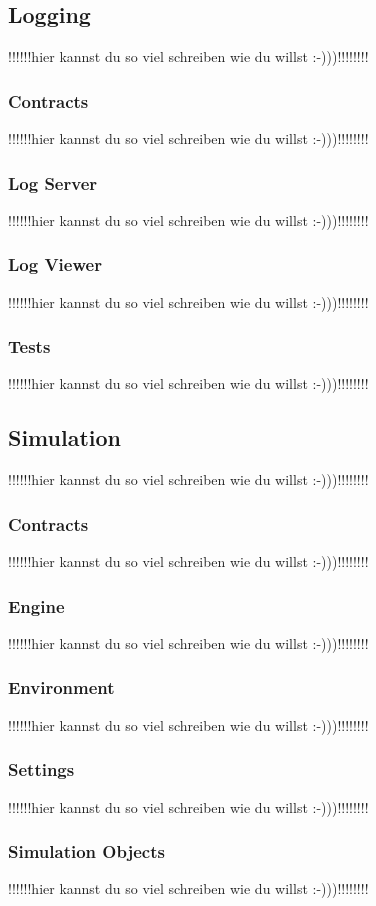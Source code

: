 \documentclass[12pt,a4paper,bibliography=totocnumbered,listof=totocnumbered]{scrartcl}
\begin{document}
\subsection{Logging}
!!!!!!hier kannst du so viel schreiben wie du willst :-)))!!!!!!!!
\subsubsection{Contracts}
!!!!!!hier kannst du so viel schreiben wie du willst :-)))!!!!!!!!
\subsubsection{Log Server}
!!!!!!hier kannst du so viel schreiben wie du willst :-)))!!!!!!!!
\subsubsection{Log Viewer}
!!!!!!hier kannst du so viel schreiben wie du willst :-)))!!!!!!!!
\subsubsection{Tests}
!!!!!!hier kannst du so viel schreiben wie du willst :-)))!!!!!!!!

\subsection{Simulation}
!!!!!!hier kannst du so viel schreiben wie du willst :-)))!!!!!!!!
\subsubsection{Contracts}
!!!!!!hier kannst du so viel schreiben wie du willst :-)))!!!!!!!!
\subsubsection{Engine}
!!!!!!hier kannst du so viel schreiben wie du willst :-)))!!!!!!!!
\subsubsection{Environment}
!!!!!!hier kannst du so viel schreiben wie du willst :-)))!!!!!!!!
\subsubsection{Settings}
!!!!!!hier kannst du so viel schreiben wie du willst :-)))!!!!!!!!
\subsubsection{Simulation Objects}
!!!!!!hier kannst du so viel schreiben wie du willst :-)))!!!!!!!!
\end{document}

